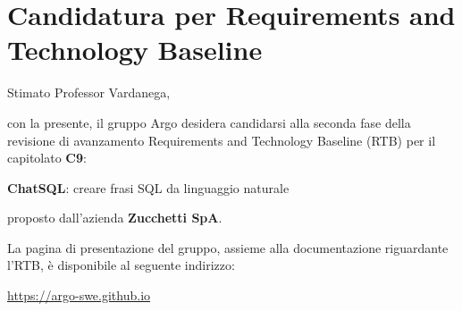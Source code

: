 





\makeFrontPage

\section*{Candidatura per Requirements and Technology Baseline}

\par Stimato Professor Vardanega, \newline

con la presente, il gruppo Argo desidera candidarsi alla seconda fase della revisione di avanzamento Requirements and Technology Baseline (RTB) per il capitolato \textbf{C9}: \newline

\quad \textbf{ChatSQL}: creare frasi SQL da linguaggio naturale \newline

proposto dall'azienda \textbf{Zucchetti SpA}. \newline

\par La pagina di presentazione del gruppo, assieme alla documentazione riguardante l'RTB, è disponibile al seguente indirizzo: \newline

\quad \href{https://argo-swe.github.io}{https://argo-swe.github.io} \newline

